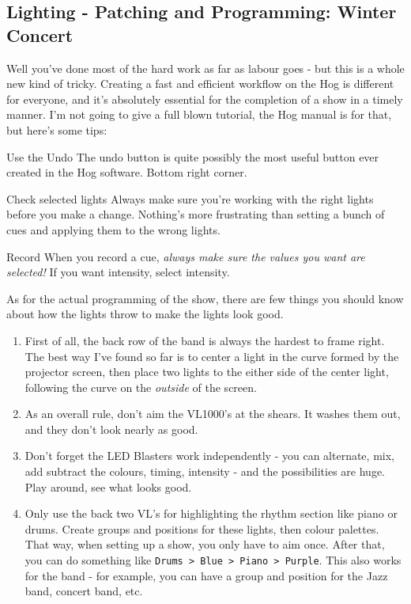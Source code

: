 \documentclass[11pt,a4paper]{book}
\begin{document}
\subsection{Lighting - Patching and Programming: Winter Concert}
Well you've done most of the hard work as far as labour goes - but this is a whole new kind of tricky. Creating a fast and efficient workflow on the Hog is different for everyone, and it's absolutely essential for the completion of a show in a timely manner. I'm not going to give a full blown tutorial, the Hog manual is for that, but here's some tips:
\\
\begin{compactdesc}
\item[Use the Undo] The undo button is quite possibly the most useful button ever created in the Hog software. Bottom right corner.
\item[Check selected lights] Always make sure you're working with the right lights before you make a change. Nothing's more frustrating than setting a bunch of cues and applying them to the wrong lights.
\item[Record] When you record a cue, \textit{always make sure the values you want are selected!} If you want intensity, select intensity.\\
\end{compactdesc}

As for the actual programming of the show, there are few things you should know about how the lights throw to make the lights look good. 

\begin{enumerate}
\item First of all, the back row of the band is always the hardest to frame right. The best way I've found so far is to center a light in the curve formed by the projector screen, then place two lights to the either side of the center light, following the curve on the \textit{outside} of the screen.
\item As an overall rule, don't aim the VL1000's at the shears. It washes them out, and they don't look nearly as good.
\item Don't forget the LED Blasters work independently - you can alternate, mix, add subtract the colours, timing, intensity - and the possibilities are huge. Play around, see what looks good. 
\item Only use the back two VL's for highlighting the rhythm section like piano or drums. Create groups and positions for these lights, then colour palettes. That way, when setting up a show, you only have to aim once. After that, you can do something like \texttt{Drums > Blue > Piano > Purple}. This also works for the band - for example, you can have a group and position for the Jazz band, concert band, etc.
\end{enumerate}
\end{document}
